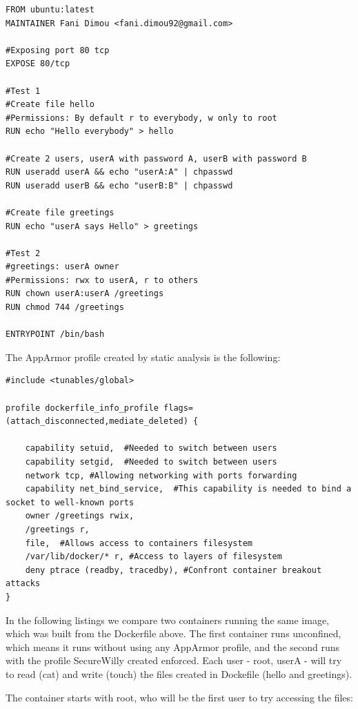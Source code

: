\begin{lstlisting}[style=Dockerfile, caption={Dockerfile example for static analysis}]
FROM ubuntu:latest
MAINTAINER Fani Dimou <fani.dimou92@gmail.com>

#Exposing port 80 tcp
EXPOSE 80/tcp

#Test 1
#Create file hello
#Permissions: By default r to everybody, w only to root
RUN echo "Hello everybody" > hello

#Create 2 users, userA with password A, userB with password B
RUN useradd userA && echo "userA:A" | chpasswd
RUN useradd userB && echo "userB:B" | chpasswd

#Create file greetings
RUN echo "userA says Hello" > greetings

#Test 2
#greetings: userA owner
#Permissions: rwx to userA, r to others
RUN chown userA:userA /greetings
RUN chmod 744 /greetings

ENTRYPOINT /bin/bash
\end{lstlisting}
\hfill\break
The AppArmor profile created by static analysis is the following:
\hfill\break
\begin{lstlisting}[style=Dockerfile, caption={AppArmor profile for example Dockerfile in static analysis}]
#include <tunables/global>

profile dockerfile_info_profile flags=(attach_disconnected,mediate_deleted) {

	capability setuid,  #Needed to switch between users
	capability setgid,  #Needed to switch between users
	network tcp, #Allowing networking with ports forwarding
	capability net_bind_service,  #This capability is needed to bind a socket to well-known ports
	owner /greetings rwix,
	/greetings r,
	file,  #Allows access to containers filesystem
	/var/lib/docker/* r, #Access to layers of filesystem
	deny ptrace (readby, tracedby), #Confront container breakout attacks
}
\end{lstlisting}

In the following listings we compare two containers running the same image, which was built from the Dockerfile above. The first container runs unconfined, which means it runs without using any AppArmor profile, and the second runs with the profile SecureWilly created enforced. Each user - root, userA - will try to read (cat) and write (touch) the files created in Dockefile (hello and greetings).

The container starts with root, who will be the first user to try accessing the files:

